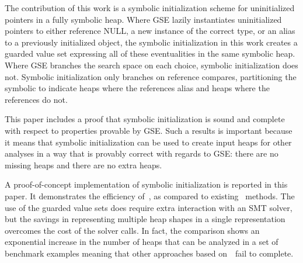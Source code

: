 The contribution of this work is a symbolic initialization scheme for uninitialized pointers in a fully symbolic heap. Where GSE lazily instantiates uninitialized pointers to either reference NULL, a new instance of the correct type, or an alias to a previously initialized object, the symbolic initialization in this work creates a guarded value set expressing all of these eventualities in the same symbolic heap. Where GSE branches the search space on each choice, symbolic initialization does not. Symbolic initialization only branches on reference compares, partitioning the symbolic to indicate heaps where the references alias and heaps where the references do not.

This paper includes a proof that symbolic initialization is sound and complete with respect to properties provable by GSE. Such a results is important because it means that symbolic initialization can be used to create input heaps for other analyses in a way that is provably correct with regards to GSE: there are no missing heaps and there are no extra heaps. 

A proof-of-concept implementation of symbolic initialization is reported in this paper. It demonstrates the efficiency of~\symtxt{}, as compared to existing~\gsetxt{} methods. The use of the guarded value sets does require extra interaction with an SMT solver, but the savings in representing multiple heap shapes in a single representation overcomes the cost of the solver calls. In fact, the comparison shows an exponential increase in the number of heaps that can be analyzed in a set of benchmark examples meaning that other approaches based on~\gsetxt\ fail to complete.

